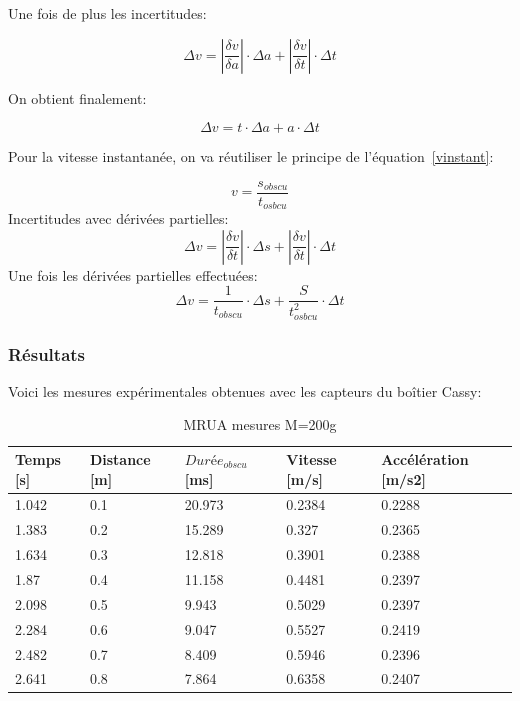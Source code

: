 Une fois de plus les incertitudes:

\begin{equation}
    \Delta v = |\frac{\delta v}{\delta a}|\cdot \Delta a + |\frac{\delta v}{\delta t}|\cdot \Delta t
\end{equation}

On obtient finalement:

\begin{equation}
    \Delta v = t \cdot \Delta a + a \cdot \Delta t
\end{equation}

Pour la vitesse instantanée, on va réutiliser le principe de l'équation~\eqref{vinstant}:

\begin{equation}
    v= \frac{s_{obscu}}{t_{osbcu}}
\end{equation}
Incertitudes avec dérivées partielles:
\begin{equation}
    \Delta v = |\frac{\delta v}{\delta t}|\cdot \Delta s + |\frac{\delta v}{\delta t}|\cdot \Delta t
\end{equation}
Une fois les dérivées partielles effectuées:
\begin{equation}
    \Delta v = \frac{1}{t_{obscu}}\cdot \Delta s + \frac{S}{t_{osbcu}^2}\cdot \Delta t
\end{equation}

\newpage
\subsubsection{Résultats}

Voici les mesures expérimentales obtenues avec les capteurs du boîtier Cassy:

\begin{table}[ht]
    \centering
    \caption[MRUA mesures M=200g]{MRUA mesures M=200g}
    \begin{tabular}{|l|l|l|l|l|}
	\hline
	Temps [s]	&Distance [m]	&$Durée_{obscu}$ [ms]	&Vitesse [m/s]	&Accélération [m/s2]\\
	\hline
	1.042	&0.1	&20.973	&0.2384	&0.2288 \\
	1.383	&0.2	&15.289	&0.327	&0.2365 \\
	1.634	&0.3	&12.818	&0.3901	&0.2388 \\
	1.87	&0.4	&11.158	&0.4481	&0.2397 \\
	2.098	&0.5	&9.943	&0.5029	&0.2397 \\
	2.284	&0.6	&9.047	&0.5527	&0.2419 \\
	2.482	&0.7	&8.409	&0.5946	&0.2396 \\
	2.641	&0.8	&7.864	&0.6358	&0.2407 \\
	\hline
    \end{tabular}
\end{table}

